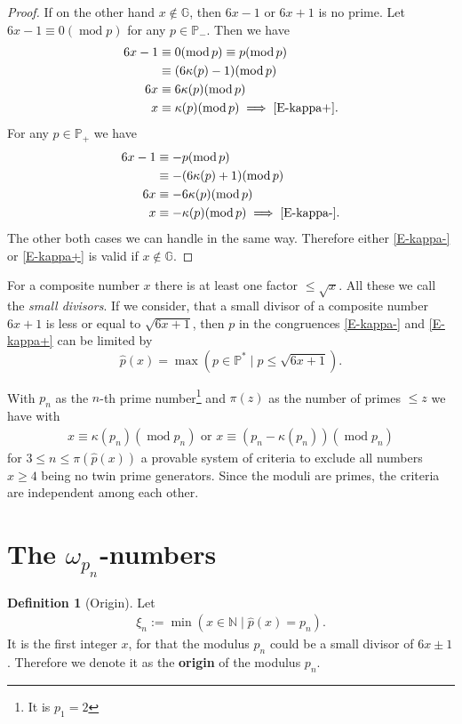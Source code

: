 \documentclass[fmeq,reqno]{amsart}
\theoremstyle{definition}
\newtheorem{definition}[theorem]{Definition}
\theoremstyle{remark}
\numberwithin{equation}{section}
\newcommand{\N}{\mathbb{N}}
\newcommand{\G}{\mathbb{G}}
\newcommand{\p}{\mathbb{P}}
\newcommand{\mood}[1]{(\operatorname{mod} #1)}
\newcommand{\opn}[1]{\operatorname{#1}}
\newcommand{\om}[1]{$\omega_{#1}$}
\begin{document}
\begin{proof}
If on the other hand $x \notin \G$, then $6x-1$ or $6x+1$ is no prime. 
Let $6x-1 \equiv 0 \mood{p}$ for any $p \in \p_-$. Then we have
\begin{align*}
6x-1 &\equiv 0 \mood{p}\equiv p \mood{p}\\
&\equiv (6\kappa(p)-1) \mood{p}\\
6x &\equiv 6\kappa(p) \mood{p}\\
x &\equiv \kappa(p) \mood{p}\implies \eqref{E-kappa+}.
\end{align*}
For any $p \in \p_+$ we have
\begin{align*}
6x-1 &\equiv -p \mood{p}\\
&\equiv -(6\kappa(p)+1) \mood{p}\\
6x &\equiv -6\kappa(p) \mood{p}\\
x &\equiv -\kappa(p) \mood{p}\implies \eqref{E-kappa-}.
\end{align*}
The other both cases we can handle in the same way. Therefore either \eqref{E-kappa-} or \eqref{E-kappa+} is valid if $x \notin \G$.
\end{proof}

For a composite number $x$ there is at least one factor $\leq\sqrt{x}$. All these we call the \emph{small divisors}.
If we consider, that a small divisor of a composite number $6x+1$ is less or equal to $\sqrt{6x+1}$, then $p$ in the congruences \eqref{E-kappa-} and \eqref{E-kappa+} can be limited by 
\[
\hat{p}(x)= \opn{max}(p \in \p^* \mid p \leq \sqrt{6x+1}).
\]

With $p_n$ as the $n$-th prime number\footnote{It is $p_1=2$}
and $\pi(z)$ as the number of primes $\leq z$ we have with 
\begin{align}\label{E-provable_system}
x \equiv  \kappa(p_n) \mood{p_n}
\mbox{ or }
x \equiv \left( p_n - \kappa(p_n)\right) \mood{p_n}
\end{align}
for $3 \leq n \leq \pi\left(\hat{p}(x)\right)$ a provable system of criteria to exclude all numbers $x \geq 4$ being no twin prime generators.
Since the moduli are primes, the criteria are independent among each other.
\medskip

\section{The \om{p_n}-numbers}

\begin{definition}[Origin]\label{D-origin}
Let
\begin{align}\label{E-origin}
\xi_n := \min(x \in \N \mid \hat{p}(x) = p_n).
\end{align}
It is the first integer $x$, for that the modulus $p_n$ could be a small divisor of $6x\pm 1$. Therefore we denote it as the \textbf{origin} of the modulus $p_n$.
\end{definition}
\end{document}

